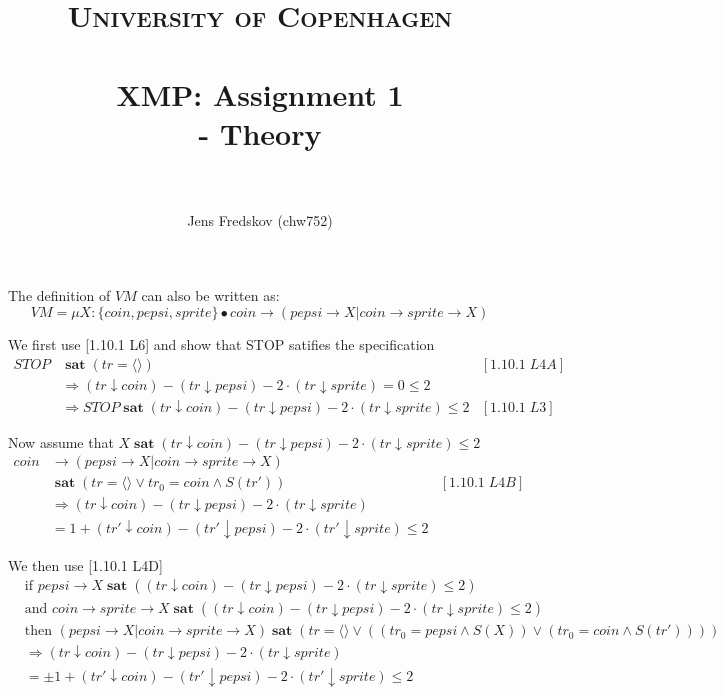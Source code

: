 \documentclass[a4paper, 11pt]{article}
\title{ 
\normalfont \normalsize 
\textsc{University of Copenhagen} \\ [25pt]
\horrule{0.5pt} \\[0.4cm]
\huge XMP: Assignment 1 \\ \Large - Theory \\
\horrule{2pt} \\[0.5cm]
}
\author{Jens Fredskov (chw752)}
\def\sat{\mathbf{\;sat\;}}
\begin{document}
\maketitle
\pagebreak

\section{} %

The definition of $VM$ can also be written as:
\[
    VM = \mu X : \{ coin, pepsi, sprite\} \bullet coin \rightarrow (pepsi \rightarrow X | coin \rightarrow sprite \rightarrow X)
\]

We first use [1.10.1 L6] and show that STOP satifies the specification
\begin{align*}
STOP & \sat (tr = \langle \rangle) & [1.10.1\;L4A] \\
     & \Rightarrow (tr \downarrow coin) - (tr \downarrow pepsi) - 2 \cdot (tr \downarrow sprite) = 0 \le 2 \\
     & \Rightarrow STOP \sat (tr \downarrow coin) - (tr \downarrow pepsi) - 2 \cdot (tr \downarrow sprite) \le 2 & [1.10.1\;L3]
\end{align*}

Now assume that $X \sat (tr \downarrow coin) - (tr \downarrow pepsi) - 2 \cdot (tr \downarrow sprite) \le 2$
\begin{align*}
coin & \rightarrow (pepsi \rightarrow X | coin \rightarrow sprite \rightarrow X) \\
     & \sat (tr = \langle \rangle \vee tr_0 = coin \wedge S(tr')) & [1.10.1\;L4B] \\
     & \Rightarrow (tr \downarrow coin) - (tr \downarrow pepsi) - 2 \cdot (tr \downarrow sprite) \\
     & = 1 + (tr' \downarrow coin) - (tr' \downarrow pepsi) - 2 \cdot (tr' \downarrow sprite) \le 2
\end{align*}

We then use [1.10.1 L4D]
\begin{align*}
& \text{if } pepsi \rightarrow X \sat ((tr \downarrow coin) - (tr \downarrow pepsi) - 2 \cdot (tr \downarrow sprite) \le 2) \\
& \text{and } coin \rightarrow sprite \rightarrow X \sat ((tr \downarrow coin) - (tr \downarrow pepsi) - 2 \cdot (tr \downarrow sprite) \le 2) \\
& \text{then } (pepsi \rightarrow X | coin \rightarrow sprite \rightarrow X) \sat (tr = \langle \rangle \vee ((tr_0 = pepsi \wedge S(X)) \vee (tr_0 = coin \wedge S(tr')))) \\
& \Rightarrow (tr \downarrow coin) - (tr \downarrow pepsi) - 2 \cdot (tr \downarrow sprite) \\
& = \pm 1 + (tr' \downarrow coin) - (tr' \downarrow pepsi) - 2 \cdot (tr' \downarrow sprite) \le 2
\end{align*}
\end{document}

